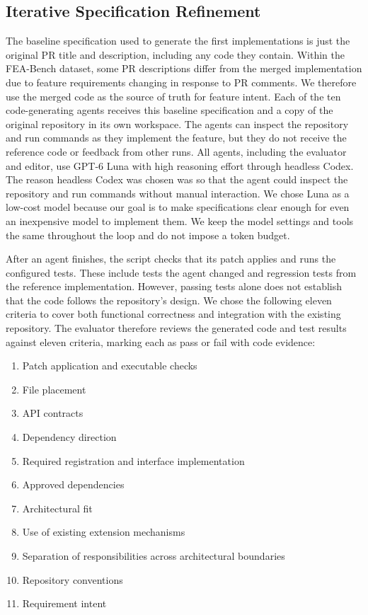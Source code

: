 \documentclass[sigconf,nonacm]{acmart}
\begin{document}
\subsection{Iterative Specification Refinement}

The baseline specification used to generate the first implementations is just the original PR title and description, including any code they contain. Within the FEA-Bench dataset, some PR descriptions differ from the merged implementation due to feature requirements changing in response to PR comments. We therefore use the merged code as the source of truth for feature intent. Each of the ten code-generating agents receives this baseline specification and a copy of the original repository in its own workspace. The agents can inspect the repository and run commands as they implement the feature, but they do not receive the reference code or feedback from other runs. All agents, including the evaluator and editor, use GPT-6 Luna with high reasoning effort through headless Codex. The reason headless Codex was chosen was so that the agent could inspect the repository and run commands without manual interaction. We chose Luna as a low-cost model because our goal is to make specifications clear enough for even an inexpensive model to implement them. We keep the model settings and tools the same throughout the loop and do not impose a token budget.

After an agent finishes, the script checks that its patch applies and runs the configured tests. These include tests the agent changed and regression tests from the reference implementation. However, passing tests alone does not establish that the code follows the repository's design. We chose the following eleven criteria to cover both functional correctness and integration with the existing repository. The evaluator therefore reviews the generated code and test results against eleven criteria, marking each as pass or fail with code evidence:

\begin{enumerate}
  \item Patch application and executable checks
  \item File placement
  \item API contracts
  \item Dependency direction
  \item Required registration and interface implementation
  \item Approved dependencies
  \item Architectural fit
  \item Use of existing extension mechanisms
  \item Separation of responsibilities across architectural boundaries
  \item Repository conventions
  \item Requirement intent
\end{enumerate}
\end{document}
